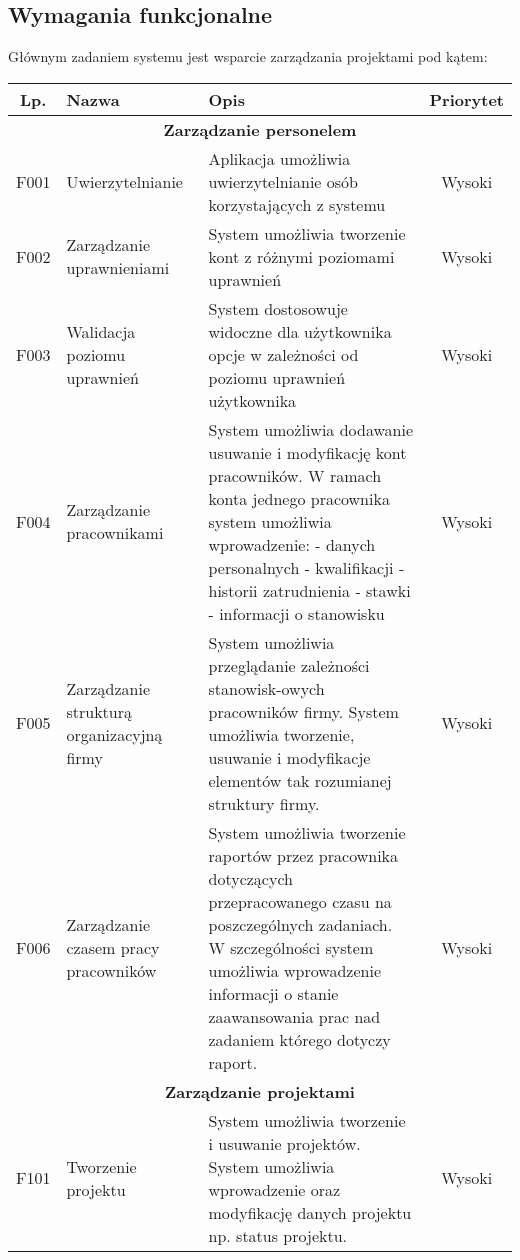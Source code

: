 \subsection{Wymagania funkcjonalne}
Głównym zadaniem systemu jest wsparcie zarządzania projektami pod kątem:

\begin{tabularx}{\textwidth}{|c|X|X|c|}
\hline 
Lp. & Nazwa & Opis & Priorytet \\ 
\hline 
\multicolumn{4}{|c|}{\textbf{Zarządzanie personelem}} \\
\hline 
F001 & Uwierzytelnianie & Aplikacja umożliwia uwierzytelnianie osób korzystających z systemu  & Wysoki \\ 
\hline 
F002 & Zarządzanie uprawnieniami & System umożliwia tworzenie kont z różnymi poziomami uprawnień & Wysoki \\ 
\hline 
F003 & Walidacja poziomu uprawnień & System dostosowuje widoczne dla użytkownika opcje w zależności od poziomu uprawnień użytkownika  & Wysoki \\ 
\hline 
F004 & Zarządzanie pracownikami & System umożliwia dodawanie usuwanie i modyfikację kont pracowników. W ramach konta jednego pracownika system umożliwia wprowadzenie: \newline
- danych personalnych \newline
- kwalifikacji \newline
- historii zatrudnienia \newline 
- stawki \newline
- informacji o stanowisku
& Wysoki \\
\hline 
F005 & Zarządzanie strukturą organizacyjną firmy & System umożliwia przeglądanie zależności stanowisk-owych pracowników firmy. System umożliwia tworzenie, usuwanie i modyfikacje elementów tak rozumianej struktury firmy. & Wysoki \\ 
\hline 
F006 & Zarządzanie czasem pracy pracowników & System umożliwia tworzenie raportów przez pracownika dotyczących przepracowanego czasu na poszczególnych zadaniach. W szczególności system umożliwia wprowadzenie informacji o stanie zaawansowania prac nad zadaniem którego dotyczy raport. & Wysoki \\ 
\hline 
\multicolumn{4}{|c|}{\textbf{Zarządzanie projektami}} \\
\hline 
F101 &  Tworzenie projektu & System umożliwia tworzenie i usuwanie projektów. System umożliwia wprowadzenie oraz modyfikację danych projektu np. status projektu. & Wysoki \\ 

\end{tabularx}
